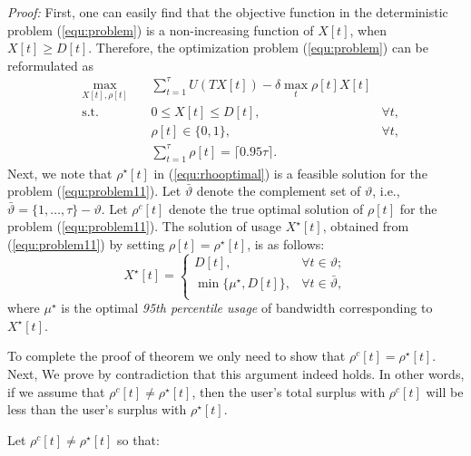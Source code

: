 \documentclass[10pt,journal,compsoc]{IEEEtran}
\begin{document}
\emph{Proof:} First, one can easily find that the objective function in the deterministic problem (\ref{equ:problem}) is a non-increasing function of $X[t]$, when $X[t]\geq D[t]$. Therefore, the optimization problem (\ref{equ:problem}) can be reformulated  as 
\begin{equation}\label{equ:problem11}
\begin{aligned}
& \underset{X[t],\rho[t]}{\text{max}} \!\!\!\!\!\!\
& &  \sum_{t=1}^{\tau} {U(TX[t])}-\delta \max_{t}\rho[t]X[t]\\
& \text{s.t.} & & 0 \leq X[t] \leq D[t], & \forall t, \\
&&& \rho[t] \in \{0,1\},& \forall t, \\
&&& \sum_{t=1}^{\tau} {\rho[t]}=\lceil0.95\tau\rceil.
\end{aligned}
\end{equation}
Next, we note that $\rho^\star[t]$ in (\ref{equ:rhooptimal}) is a feasible solution for the problem (\ref{equ:problem11}). Let $\bar{\vartheta}$ denote the complement set of $\vartheta$, i.e., $\bar{\vartheta}=\{1,\ldots,\tau\}-\vartheta$. Let $\rho^{c}[t]$ denote the true optimal solution of $\rho[t]$ for the  problem (\ref{equ:problem11}). The  solution of  usage  $X^{\star}[t]$, obtained from  (\ref{equ:problem11}) by setting $\rho[t]=\rho^\star[t]$,  is as follows:
\begin{equation}\label{equ:lemmasatisfied}
X^{\star}[t]=
\begin{cases}
D[t], &\forall t \in \vartheta;\\
\min\{\mu^{\star},D[t]\}, &\forall t \in \bar{\vartheta},\\
\end{cases}
\end{equation}
where $\mu^{\star}$ is the optimal \emph{95th percentile usage} of bandwidth corresponding to $X^{\star}[t]$.



To complete the proof of theorem we only need to show that $\rho^c[t]=\rho^\star[t]$. 
Next, We prove by contradiction that this argument indeed holds.  In other words, if   we assume that $\rho^{c}[t] \neq \rho^\star[t]$, then the user's total surplus with $\rho^{c}[t]$ will be less than the user's surplus with $\rho^\star[t]$. 

Let  $\rho^{c}[t] \neq \rho^\star[t]$ so that: 
\end{document}
